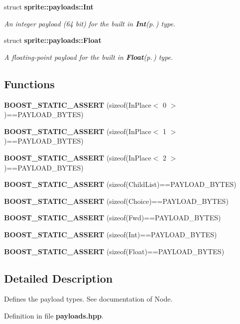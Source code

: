 \begin{CompactItemize}
struct {\bf sprite::payloads::Int}
\begin{CompactList}\small\item\em An integer payload (64 bit) for the built in {\bf Int}{\rm (p.\,\pageref{structsprite_1_1payloads_1_1Int})} type. \item\end{CompactList}\item 
struct {\bf sprite::payloads::Float}
\begin{CompactList}\small\item\em A floating-point payload for the built in {\bf Float}{\rm (p.\,\pageref{structsprite_1_1payloads_1_1Float})} type. \item\end{CompactList}\end{CompactItemize}
\subsection*{Functions}
\begin{CompactItemize}
\item 
{\bf BOOST\_\-STATIC\_\-ASSERT} (sizeof(In\-Place$<$ 0 $>$)==PAYLOAD\_\-BYTES)\label{namespacesprite_1_1payloads_a0}

\item 
{\bf BOOST\_\-STATIC\_\-ASSERT} (sizeof(In\-Place$<$ 1 $>$)==PAYLOAD\_\-BYTES)\label{namespacesprite_1_1payloads_a1}

\item 
{\bf BOOST\_\-STATIC\_\-ASSERT} (sizeof(In\-Place$<$ 2 $>$)==PAYLOAD\_\-BYTES)\label{namespacesprite_1_1payloads_a2}

\item 
{\bf BOOST\_\-STATIC\_\-ASSERT} (sizeof(Child\-List)==PAYLOAD\_\-BYTES)\label{namespacesprite_1_1payloads_a3}

\item 
{\bf BOOST\_\-STATIC\_\-ASSERT} (sizeof(Choice)==PAYLOAD\_\-BYTES)\label{namespacesprite_1_1payloads_a4}

\item 
{\bf BOOST\_\-STATIC\_\-ASSERT} (sizeof(Fwd)==PAYLOAD\_\-BYTES)\label{namespacesprite_1_1payloads_a5}

\item 
{\bf BOOST\_\-STATIC\_\-ASSERT} (sizeof(Int)==PAYLOAD\_\-BYTES)\label{namespacesprite_1_1payloads_a6}

\item 
{\bf BOOST\_\-STATIC\_\-ASSERT} (sizeof(Float)==PAYLOAD\_\-BYTES)\label{namespacesprite_1_1payloads_a7}

\end{CompactItemize}


\subsection{Detailed Description}
Defines the payload types. See documentation of Node. 



Definition in file {\bf payloads.hpp}.